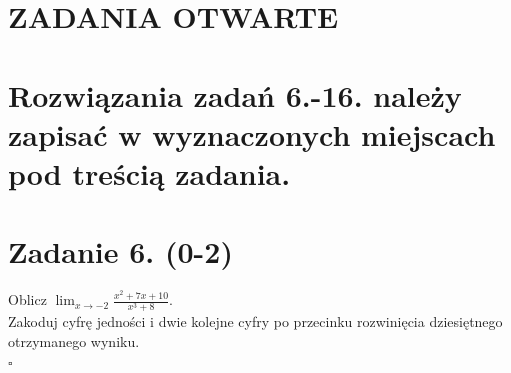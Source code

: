\documentclass[10pt]{article}
\begin{document}
\section*{ZADANIA OTWARTE}
\section*{Rozwiązania zadań 6.-16. należy zapisać w wyznaczonych miejscach pod treścią zadania.}
\section*{Zadanie 6. (0-2)}
Oblicz \(\lim _{x \rightarrow-2} \frac{x^{2}+7 x+10}{x^{3}+8}\).\\
Zakoduj cyfrę jedności i dwie kolejne cyfry po przecinku rozwinięcia dziesiętnego otrzymanego wyniku.\\
\(\square\)
\end{document}

